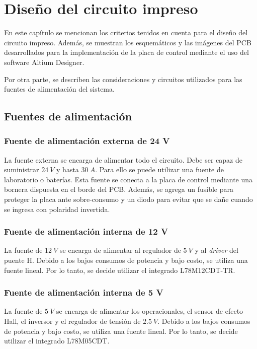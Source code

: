 \chapter{Diseño del circuito impreso}  \label{cap:PCB}

En este capítulo se mencionan los criterios tenidos en cuenta para el diseño del circuito impreso. Además, se muestran los esquemáticos y las imágenes del PCB desarrollados para la implementación de la placa de control mediante el uso del software Altium Designer. 

Por otra parte, se describen las consideraciones y circuitos utilizados para las fuentes de alimentación del sistema.



\section{Fuentes de alimentación}

\subsection{Fuente de alimentación externa de 24 V}

La fuente externa se encarga de alimentar todo el circuito. Debe ser capaz de suministrar $24\:V$ y hasta $30\:A$. Para ello se puede utilizar una fuente de laboratorio o baterías. Esta fuente se conecta a la placa de control mediante una bornera dispuesta en el borde del PCB. Además, se agrega un fusible para proteger la placa ante sobre-consumo y un diodo para evitar que se dañe cuando se ingresa con polaridad invertida.

\subsection{Fuente de alimentación interna de 12 V}

La fuente de $12\:V$ se encarga de alimentar al regulador de $5\:V$ y al \textsl{driver} del puente H. Debido a los bajos consumos de potencia y bajo costo, se utiliza una fuente lineal. Por lo tanto, se decide utilizar el integrado L78M12CDT-TR.


\subsection{Fuente de alimentación interna de 5 V}

La fuente de $5\:V$ se encarga de alimentar los operacionales, el sensor de efecto Hall, el inversor y el regulador de tensión de $2.5\:V$. Debido a los bajos consumos de potencia y bajo costo, se utiliza una fuente lineal. Por lo tanto, se decide utilizar el integrado L78M05CDT.

